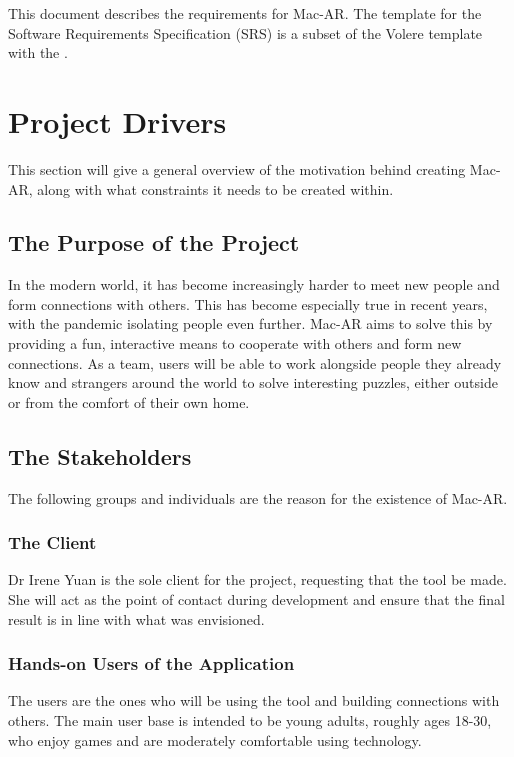 \documentclass[12pt]{article}
\begin{document}
\newpage


This document describes the requirements for Mac-AR. The template for the Software Requirements
Specification (SRS) is a subset of the Volere template~\citep{RobertsonAndRobertson2012} with the .

\section{Project Drivers}

This section will give a general overview of the motivation behind creating Mac-AR, along with what constraints it needs to be created within. 

\subsection{The Purpose of the Project}
In the modern world, it has become increasingly harder to meet new people and form connections with others. This has become especially true in recent years, with the pandemic isolating people even further. Mac-AR aims to solve this by providing a fun, interactive means to cooperate with others and form new connections. As a team, users will be able to work alongside people they already know and strangers around the world to solve interesting puzzles, either outside or from the comfort of their own home. 

\subsection{The Stakeholders}
The following groups and individuals are the reason for the existence of Mac-AR. 

\subsubsection{The Client}
Dr Irene Yuan is the sole client for the project, requesting that the tool be made. She will act as the point of contact during development and ensure that the final result is in line with what was envisioned. 

\subsubsection{Hands-on Users of the Application}
The users are the ones who will be using the tool and building connections with others. The main user base is intended to be young adults, roughly ages 18-30, who enjoy games and are moderately comfortable using technology.
\end{document}
